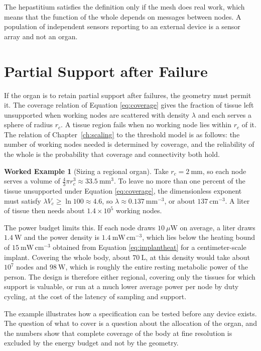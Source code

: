 \documentclass[11pt,openany]{book}
\theoremstyle{definition}
\newtheorem{example}{Worked Example}[chapter]
\theoremstyle{remark}
\begin{document}
The hepastitium satisfies the definition only if the mesh does real work, which means that the function of the whole depends on messages between nodes. A population of independent sensors reporting to an external device is a sensor array and not an organ.

\section{Partial Support after Failure}

If the organ is to retain partial support after failures, the geometry must permit it. The coverage relation of Equation \eqref{eq:coverage} gives the fraction of tissue left unsupported when working nodes are scattered with density $\lambda$ and each serves a sphere of radius $r_c$. A tissue region fails when no working node lies within $r_c$ of it. The relation of Chapter~\ref{ch:scaling} to the threshold model is as follows: the number of working nodes needed is determined by coverage, and the reliability of the whole is the probability that coverage and connectivity both hold.

\begin{example}[Sizing a regional organ]
\label{ex:sizing}
Take $r_c=2\ \mathrm{mm}$, so each node serves a volume of $\tfrac{4}{3}\pi r_c^{3}\approx33.5\ \mathrm{mm^{3}}$. To leave no more than one percent of the tissue unsupported under Equation \eqref{eq:coverage}, the dimensionless exponent must satisfy $\lambda V_c\ge\ln100\approx4.6$, so $\lambda\approx0.137\ \mathrm{mm^{-3}}$, or about $137\ \mathrm{cm^{-3}}$. A liter of tissue then needs about $1.4\times10^{5}$ working nodes.

The power budget limits this. If each node draws $10\ \mu\mathrm{W}$ on average, a liter draws $1.4\ \mathrm{W}$ and the power density is $1.4\ \mathrm{mW\,cm^{-3}}$, which lies below the heating bound of $15\ \mathrm{mW\,cm^{-3}}$ obtained from Equation \eqref{eq:implantheat} for a centimeter-scale implant. Covering the whole body, about $70\ \mathrm{L}$, at this density would take about $10^{7}$ nodes and $98\ \mathrm{W}$, which is roughly the entire resting metabolic power of the person. The design is therefore either regional, covering only the tissues for which support is valuable, or run at a much lower average power per node by duty cycling, at the cost of the latency of sampling and support.
\end{example}

The example illustrates how a specification can be tested before any device exists. The question of what to cover is a question about the allocation of the organ, and the numbers show that complete coverage of the body at fine resolution is excluded by the energy budget and not by the geometry.
\end{document}
